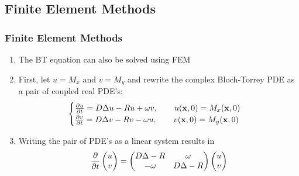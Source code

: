 \subsection{Finite Element Methods}

\begin{frame}
\frametitle{Finite Element Methods}
\begin{enumerate}
    \item The BT equation can also be solved using FEM
    \item First, let $u=M_x$ and $v=M_y$ and rewrite the complex Bloch-Torrey PDE as a pair of coupled real PDE's:
    \begin{equation*}
    \begin{cases}
        \frac{\partial u}{\partial t} = D \mbox{$\Delta$}{u} - R u + \omega v, \qquad u(\mathbf{x},0) = M_x(\mathbf{x},0) \\
        \frac{\partial v}{\partial t} = D \mbox{$\Delta$}{v} - R v - \omega u, \qquad v(\mathbf{x},0) = M_y(\mathbf{x},0)
    \end{cases}
    \end{equation*}
    \item Writing the pair of PDE's as a linear system results in
    \begin{align*}
    \frac{\partial }{\partial t}
    \begin{pmatrix} u \\ v \end{pmatrix}
    = \begin{pmatrix}
    D \mbox{$\Delta$}{} - R & \omega \\ 
    -\omega & D \mbox{$\Delta$}{} - R
    \end{pmatrix}
    \begin{pmatrix} u \\ v \end{pmatrix}
    \end{align*}
\end{enumerate}
\end{frame}

